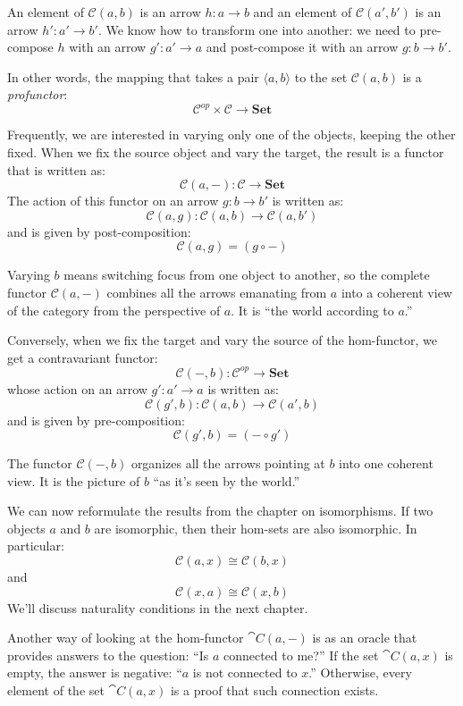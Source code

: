 \documentclass[DaoFP]{subfiles}
\begin{document}
An element of $\mathcal{C}(a, b)$ is an arrow $h \colon a \to b$ and an element of $\mathcal{C}(a', b')$ is an arrow $h' \colon a' \to b'$. We know how to transform one into another: we need to pre-compose $h$ with an arrow $g' \colon a' \to a$ and post-compose it with an arrow $g \colon b \to b'$. 

In other words, the mapping that takes a pair $\langle a, b \rangle$ to the set $\mathcal{C}(a, b)$ is a \emph{profunctor}:
\[ \mathcal{C}^{op} \times \mathcal{C} \to \mathbf{Set} \]

Frequently, we are interested in varying only one of the objects, keeping the other fixed. When we fix the source object and vary the target, the result is a functor  that is written as:
\[ \mathcal{C}(a, -) \colon \mathcal{C} \to \mathbf{Set} \]
The action of this functor on an arrow $g \colon b \to b'$ is written as:
\[ \mathcal{C}(a, g) \colon \mathcal{C}(a, b) \to \mathcal{C}(a, b') \]
and is given by post-composition:
\[\mathcal{C}(a, g) = (g \circ -) \]

Varying $b$ means switching focus from one object to another, so the complete functor $\mathcal{C}(a, -)$ combines all the arrows emanating from $a$ into a coherent view of the category from the perspective of $a$. It is ``the world according to $a$.''

Conversely, when we fix the target and vary the source of the hom-functor, we get a contravariant functor:
\[ \mathcal{C}(-, b) \colon \mathcal{C}^{op} \to \mathbf{Set} \]
whose action on an arrow $g' \colon a' \to a$ is written as:
\[ \mathcal{C}(g', b) \colon \mathcal{C}(a, b) \to \mathcal{C}(a', b) \]
and is given by pre-composition:
\[\mathcal{C}(g', b) = (- \circ g') \]

The functor $\mathcal{C}(-, b)$ organizes all the arrows pointing at $b$ into one coherent view. It is the picture of $b$ ``as it's seen by the world.''

We can now reformulate the results from the chapter on isomorphisms. If two objects $a$ and $b$ are isomorphic, then their hom-sets are also isomorphic. In particular:
\[\mathcal{C}(a, x) \cong \mathcal{C}(b, x)\]
and 
\[\mathcal{C}(x, a) \cong \mathcal{C}(x, b)\]
We'll discuss naturality conditions in the next chapter.

Another way of looking at the hom-functor $\cat C(a, -)$ is as an oracle that  provides answers to the question: ``Is $a$ connected to me?'' If the set $\cat C(a, x)$ is empty, the answer is negative: ``$a$ is not connected to $x$.'' Otherwise, every element of the set $\cat C(a, x)$ is a proof that such connection exists. 
\end{document}
